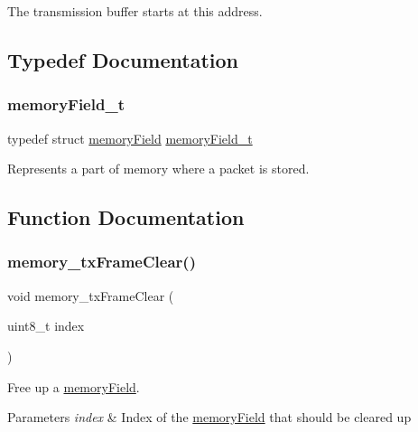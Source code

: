 The transmission buffer starts at this address. 



\subsection{Typedef Documentation}
\mbox{\label{group__memory_ga1d04d80fae40964f55d2df46b5d64785}} 
\subsubsection{\texorpdfstring{memoryField\_t}{memoryField\_t}}
{\footnotesize\ttfamily typedef struct \mbox{\hyperlink{structmemory_field}{memory\+Field}}  \mbox{\hyperlink{group__memory_ga1d04d80fae40964f55d2df46b5d64785}{memory\+Field\+\_\+t}}}



Represents a part of memory where a packet is stored. 



\subsection{Function Documentation}
\mbox{\label{group__memory_ga8b2a265d683cd262c1a0aa1fcb847f75}} 
\subsubsection{\texorpdfstring{memory\_txFrameClear()}{memory\_txFrameClear()}}
{\footnotesize\ttfamily void memory\+\_\+tx\+Frame\+Clear (\begin{DoxyParamCaption}\item[{uint8\+\_\+t}]{index }\end{DoxyParamCaption})}



Free up a \mbox{\hyperlink{structmemory_field}{memory\+Field}}. 


\begin{DoxyParams}{Parameters}
{\em index} & Index of the \mbox{\hyperlink{structmemory_field}{memory\+Field}} that should be cleared up \\
\hline
\end{DoxyParams}
\mbox{\label{group__memory_ga8efe1d17c78d178ef11effad448b1041}} 
